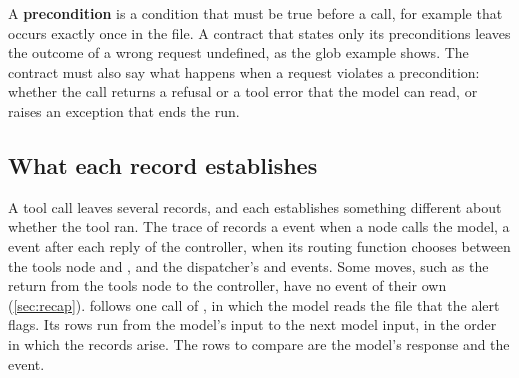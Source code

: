 A \textbf{precondition} is a condition that must be true before a call, for example that
 occurs exactly once in the file. A contract that states only its preconditions leaves
the outcome of a wrong request undefined, as the glob example shows. The contract must also say
what happens when a request violates a precondition: whether the call returns a refusal or a tool
error that the model can read, or raises an exception that ends the run.

\subsection{What each record establishes}
\label{sec:dispatcher-records}

A tool call leaves several records, and each establishes something different about whether the
tool ran. The trace of \msa{} records a  event when a node calls the model, a
 event after each reply of the controller, when its routing function chooses
between the tools node and , and the dispatcher's  and
 events. Some moves, such as the return from the tools node to the controller,
have no event of their own (\cref{sec:recap}).  follows one
 call of \msa{}, in which the model reads the file that the alert flags. Its rows run from the model's input to the next model
input, in the order in which the records arise. The rows to compare are the model's response and
the  event.

